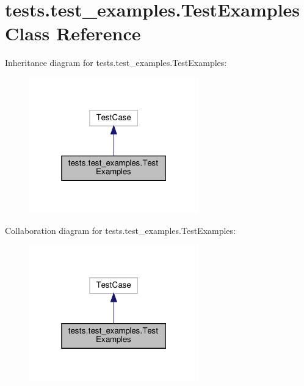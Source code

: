 \hypertarget{classtests_1_1test__examples_1_1_test_examples}{}\section{tests.\+test\+\_\+examples.\+Test\+Examples Class Reference}
\label{classtests_1_1test__examples_1_1_test_examples}


Inheritance diagram for tests.\+test\+\_\+examples.\+Test\+Examples\+:
\nopagebreak
\begin{figure}[H]
\begin{center}
\leavevmode
\includegraphics[width=208pt]{classtests_1_1test__examples_1_1_test_examples__inherit__graph}
\end{center}
\end{figure}


Collaboration diagram for tests.\+test\+\_\+examples.\+Test\+Examples\+:
\nopagebreak
\begin{figure}[H]
\begin{center}
\leavevmode
\includegraphics[width=208pt]{classtests_1_1test__examples_1_1_test_examples__coll__graph}
\end{center}
\end{figure}

